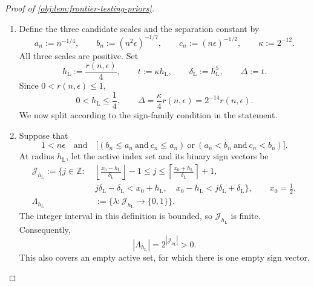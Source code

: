 \documentclass[11pt]{article}
\begin{document}

\begin{proof}[Proof of \cref{obj:lem:frontier-testing-priors}]
\begin{enumerate}
\item Define the three candidate scales and the separation constant by
\[
a_n:=n^{-1/4},\qquad
b_n:=(n^2\epsilon)^{-1/7},\qquad
c_n:=(n\epsilon)^{-1/2},\qquad
\kappa:=2^{-12}.
\]
All three scales are positive. Set
\[
h_{\mathrm L}:=\frac{r(n,\epsilon)}4,\qquad
t:=\kappa h_{\mathrm L},\qquad
\delta_{\mathrm L}:=h_{\mathrm L}^{5},\qquad
\Delta:=t.
\]
Since \(0<r(n,\epsilon)\le1\),
\[
0<h_{\mathrm L}\le\frac14,
\qquad
\Delta=\frac{\kappa}{4}r(n,\epsilon)
      =2^{-14}r(n,\epsilon).
\]
We now split according to the sign-family condition in the statement.

\item Suppose that
\[
1<n\epsilon
\quad\text{and}\quad
\bigl[(b_n\le a_n\ \text{and}\ c_n\le a_n)
\ \text{or}\
(a_n<b_n\ \text{and}\ c_n<b_n)\bigr].
\]
At radius \(h_{\mathrm L}\), let the active index set and its binary sign vectors be
\[
\begin{aligned}
\mathcal J_{h_{\mathrm L}}
:=\biggl\{j\in\mathbb Z:\;&
\left\lfloor\frac{x_0-h_{\mathrm L}}{\delta_{\mathrm L}}\right\rfloor-1
\le j\le
\left\lceil\frac{x_0+h_{\mathrm L}}{\delta_{\mathrm L}}\right\rceil+1,\\
&j\delta_{\mathrm L}-\delta_{\mathrm L}<x_0+h_{\mathrm L},
\quad
x_0-h_{\mathrm L}<j\delta_{\mathrm L}+\delta_{\mathrm L}
\biggr\},
\qquad x_0=\frac12,\\
\Lambda_{h_{\mathrm L}}&:=\{\lambda:\mathcal J_{h_{\mathrm L}}\to\{0,1\}\}.
\end{aligned}
\]
The integer interval in this definition is bounded, so \(\mathcal J_{h_{\mathrm L}}\) is finite. Consequently,
\[
|\Lambda_{h_{\mathrm L}}|=2^{|\mathcal J_{h_{\mathrm L}}|}>0.
\]
This also covers an empty active set, for which there is one empty sign vector.


\end{enumerate}
\end{proof}
\end{document}
